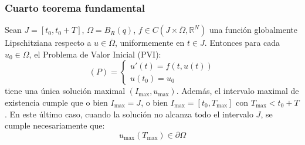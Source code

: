 \subsubsection{Cuarto teorema fundamental}

\begin{teorema}
    Sean $J = [t_0, t_0 + T]$, $\Omega = B_R(q)$, $f \in C(J \times \overline{\Omega}, \mathbb{R}^N)$ una función globalmente Lipschitziana respecto a $u \in \overline{\Omega}$, uniformemente en $t \in J$. Entonces para cada $u_0 \in \Omega$, el Problema de Valor Inicial (PVI):
    \[
        (P) =
        \begin{cases}
            u'(t) = f(t, u(t)) \\
            u(t_0) = u_0
        \end{cases}
    \]
    tiene una única solución maximal $(I_{\text{max}}, u_{\text{max}})$. Además, el intervalo maximal de existencia cumple que o bien $I_{\text{max}} = J$, o bien $I_{\text{max}} = [t_0, T_{\text{max}}]$ con $T_{\text{max}} < t_0 + T$. En este último caso, cuando la solución no alcanza todo el intervalo $J$, se cumple necesariamente que:
    \[
        u_{\text{max}}(T_{\text{max}}) \in \partial \Omega
    \]
\end{teorema}


